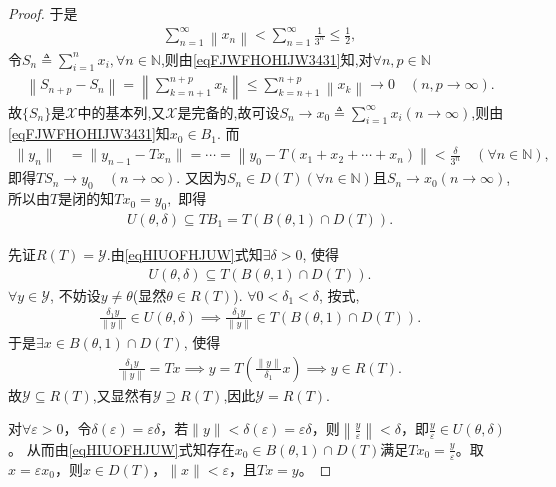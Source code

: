\documentclass[../../main.tex]{subfiles}%
\begin{document}
\begin{proof}
于是
\begin{align}\label{eqFJWFHOHIJW3431}
\sum_{n=1}^{\infty}{\left\| x_n \right\|}<\sum_{n=1}^{\infty}{\frac{1}{3^n}}\leqslant \frac{1}{2},
\end{align}
令$S_n\triangleq\sum\limits_{i=1}^{n}x_i,\forall n\in\mathbb{N}$,则由\eqref{eqFJWFHOHIJW3431}知,对$\forall n,p\in \mathbb{N}$
\begin{align*}
\left\| S_{n+p}-S_n \right\| =\left\| \sum_{k=n+1}^{n+p}{x_k} \right\| \leqslant \sum_{k=n+1}^{n+p}{\left\| x_k \right\|}\rightarrow 0\quad \left( n,p\rightarrow \infty \right) .
\end{align*}
故$\{S_n\}$是$\mathscr{X}$中的基本列,又$\mathscr{X}$是完备的,故可设$S_n\to x_0\triangleq\sum\limits_{i=1}^{\infty}x_i(n\to\infty)$,则由\eqref{eqFJWFHOHIJW3431}知$x_0\in B_1$.
而
\begin{align*}
\|y_n\|&=\|y_{n-1}-Tx_n\|=\cdots=\left\|y_0-T(x_1+x_2+\cdots+x_n)\right\|<\frac{\delta}{3^n}\quad(\forall n\in\mathbb{N}),
\end{align*}
即得$TS_n\to y_0\quad(n\to\infty).$
又因为$S_n\in D(T)(\forall n\in \mathbb{N})$且$S_n\to x_0(n\to\infty)$, 所以由$T$是闭的知$Tx_0=y_0,$
即得
\begin{align}\label{eqHIUOFHJUW}
U(\theta,\delta)\subseteq TB_1=T(B(\theta,1)\cap D(T)).
\end{align}

先证$R(T)=\mathscr{Y}$.由\eqref{eqHIUOFHJUW}式知$\exists\delta>0$, 使得
\begin{align*}
U(\theta,\delta)\subseteq T(B(\theta,1)\cap D(T)).
\end{align*}
$\forall y\in\mathscr{Y}$, 不妨设$y\neq\theta$(显然$\theta\in R(T)$). $\forall0<\delta_1<\delta$, 按式,
\begin{align*}
\frac{\delta_1 y}{\|y\|}\in U(\theta,\delta)\implies\frac{\delta_1 y}{\|y\|}\in T(B(\theta,1)\cap D(T)).
\end{align*}
于是$\exists x\in B(\theta,1)\cap D(T)$, 使得
\begin{align*}
\frac{\delta_1 y}{\|y\|}=Tx\implies y=T\left(\frac{\|y\|}{\delta_1}x\right)\implies y\in R(T).
\end{align*}
故$\mathscr{Y}\subseteq R(T)$,又显然有$\mathscr{Y}\supseteq R(T)$,因此$\mathscr{Y} = R(T)$.

对$\forall \varepsilon>0$，令$\delta(\varepsilon)=\varepsilon\delta$，若$\|y\|<\delta(\varepsilon)=\varepsilon\delta$，则$\left\|\frac{y}{\varepsilon}\right\|<\delta$，即$\frac{y}{\varepsilon}\in U(\theta,\delta)$。
从而由\eqref{eqHIUOFHJUW}式知存在$x_0\in B(\theta,1)\cap D(T)$满足$Tx_0=\frac{y}{\varepsilon}$。取$x=\varepsilon x_0$，则$x\in D(T)$，$\|x\|<\varepsilon$，且$Tx=y$。

\end{proof}
\end{document}
